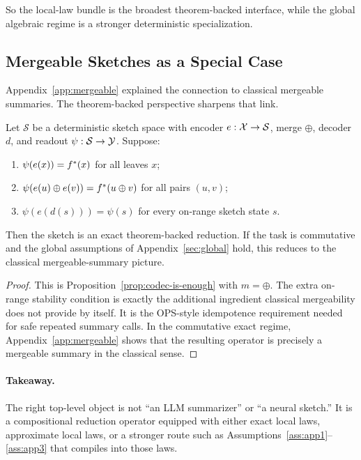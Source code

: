 So the local-law bundle is the broadest theorem-backed interface, while the
global algebraic regime is a stronger deterministic specialization.

\subsection{Mergeable Sketches as a Special Case}

Appendix~\ref{app:mergeable} explained the connection to classical mergeable
summaries. The theorem-backed perspective sharpens that link.

\begin{proposition}
\label{prop:mergeable-sketch-special-case}
Let $\mathcal{S}$ be a deterministic sketch space with encoder
$e:\mathcal{X}\to\mathcal{S}$, merge $\oplus$, decoder $d$, and readout
$\psi:\mathcal{S}\to\mathcal{Y}$. Suppose:
\begin{enumerate}[nosep]
    \item $\psi(e(x))=f^{\ast}(x)$ for all leaves $x$;
    \item $\psi(e(u)\oplus e(v))=f^{\ast}(u\oplus v)$ for all pairs $(u,v)$;
    \item $\psi(e(d(s)))=\psi(s)$ for every on-range sketch state $s$.
\end{enumerate}
Then the sketch is an exact theorem-backed reduction. If the task is
commutative and the global assumptions of Appendix~\ref{sec:global} hold, this
reduces to the classical mergeable-summary picture.
\end{proposition}

\begin{proof}
This is Proposition~\ref{prop:codec-is-enough} with $m=\oplus$. The extra
on-range stability condition is exactly the additional ingredient classical
mergeability does not provide by itself. It is the OPS-style idempotence
requirement needed for safe repeated summary calls. In the commutative exact
regime, Appendix~\ref{app:mergeable} shows that the resulting operator is
precisely a mergeable summary in the classical sense.
\end{proof}

\paragraph{Takeaway.}
The right top-level object is not ``an LLM summarizer'' or ``a neural sketch.''
It is a compositional reduction operator equipped with either exact local laws,
approximate local laws, or a stronger route such as
Assumptions~\ref{ass:app1}--\ref{ass:app3} that compiles into those laws.
